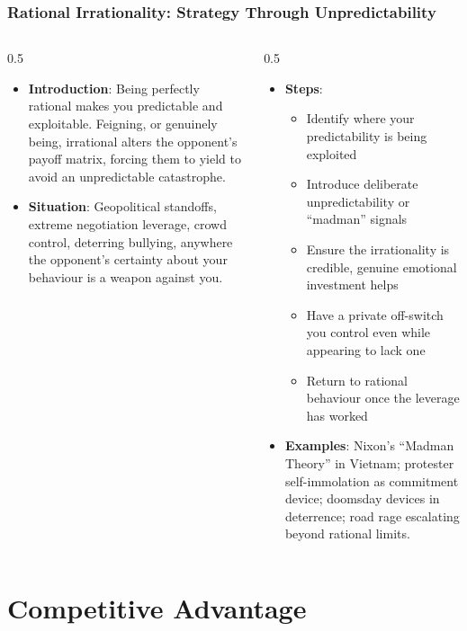 \begin{frame}[fragile]\frametitle{Rational Irrationality: Strategy Through Unpredictability}
\begin{columns}
    \begin{column}[T]{0.5\linewidth}
      \begin{itemize}
        \item \textbf{Introduction}: Being perfectly rational makes you predictable and exploitable. Feigning, or genuinely being, irrational alters the opponent's payoff matrix, forcing them to yield to avoid an unpredictable catastrophe.
        \item \textbf{Situation}: Geopolitical standoffs, extreme negotiation leverage, crowd control, deterring bullying, anywhere the opponent's certainty about your behaviour is a weapon against you.
      \end{itemize}
    \end{column}
    \begin{column}[T]{0.5\linewidth}
      \begin{itemize}
        \item \textbf{Steps}:
        \begin{itemize}
          \item Identify where your predictability is being exploited
          \item Introduce deliberate unpredictability or ``madman'' signals
          \item Ensure the irrationality is credible, genuine emotional investment helps
          \item Have a private off-switch you control even while appearing to lack one
          \item Return to rational behaviour once the leverage has worked
        \end{itemize}\item \textbf{Examples}: Nixon's ``Madman Theory'' in Vietnam; protester self-immolation as commitment device; doomsday devices in deterrence; road rage escalating beyond rational limits.
      \end{itemize}
    \end{column}
  \end{columns}
\end{frame}


\section{Competitive Advantage}

